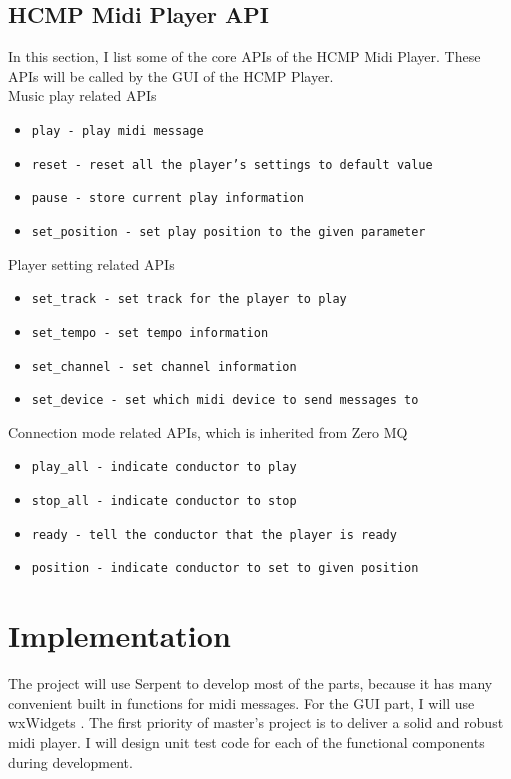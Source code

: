 \documentclass[12pt]{article} %
\begin{document}
\subsection{HCMP Midi Player API}
In this section, I list some of the core APIs of the HCMP Midi Player. These APIs will be  
called by the GUI of the HCMP Player.\\
Music play related APIs
\begin{itemize}
  \item \texttt{play - play midi message}  
  \item \texttt{reset - reset all the player's settings to default value}  
  \item \texttt{pause - store current play information}
  \item \texttt{set\_position - set play position to the given parameter}
\end{itemize}
Player setting related APIs
\begin{itemize}
  \item \texttt{set\_track - set track for the player to play}  
  \item \texttt{set\_tempo - set tempo information }  
  \item \texttt{set\_channel - set channel information}
  \item \texttt{set\_device - set which midi device to send messages to}
\end{itemize}
Connection mode related APIs, which is inherited from Zero MQ \cite{zeromq}
\begin{itemize}
  \item \texttt{play\_all - indicate conductor to play}  
  \item \texttt{stop\_all - indicate conductor to stop}  
  \item \texttt{ready - tell the conductor that the player is ready}
  \item \texttt{position - indicate conductor to set to given position}
\end{itemize}

\section{Implementation}
The project will use Serpent \cite{Serpent} to develop most of the parts, because it has many 
convenient built in functions for midi messages. For the GUI part, I will use 
wxWidgets \cite{wxWidget}. The first priority of master's project is to deliver
a solid and robust midi player. I will design unit test code for each of the functional components 
during development.
\end{document}
